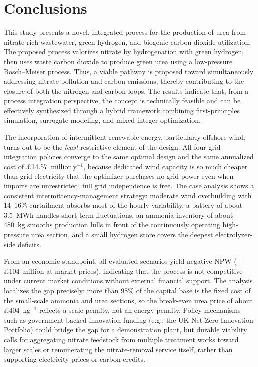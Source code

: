 \documentclass[letterpaper]{article}
\begin{document}
\section{Conclusions}

This study presents a novel, integrated process for the production of
urea from nitrate-rich wastewater, green hydrogen, and biogenic
carbon dioxide utilization. The proposed process valorizes nitrate by
hydrogenation with green hydrogen, then uses waste carbon dioxide to
produce green urea using a low-pressure Bosch--Meiser process. Thus,
a viable pathway is proposed toward simultaneously addressing nitrate
pollution and carbon emissions, thereby contributing to the closure
of both the nitrogen and carbon loops. The results indicate that,
from a process integration perspective, the concept is technically
feasible and can be effectively synthesized through a hybrid
framework combining first-principles simulation, surrogate modeling,
and mixed-integer optimization.

The incorporation of intermittent renewable energy, particularly
offshore wind, turns out to be the \emph{least} restrictive element
of the design. All four grid-integration policies converge to the
same optimal design and the same annualized cost of
\pounds 14.57~million\,y$^{-1}$, because dedicated wind capacity is
so much cheaper than grid electricity that the optimizer purchases no
grid power even when imports are unrestricted; full grid independence
is free. The case analysis shows a consistent
intermittency-management strategy: moderate wind overbuilding with
14--16\% curtailment absorbs most of the hourly variability, a
battery of about 3.5~MWh handles short-term fluctuations, an ammonia
inventory of about 480~kg smooths production lulls in front of the
continuously operating high-pressure urea section, and a small
hydrogen store covers the deepest electrolyzer-side deficits.

From an economic standpoint, all evaluated scenarios yield negative
NPW ($-$\pounds 104~million at market prices),
indicating that the process is not competitive under current market
conditions without external financial support. The analysis
localizes the gap precisely: more than 98\% of the capital base is
the fixed cost of the small-scale ammonia and urea sections, so the
break-even urea price of about \pounds 404~kg$^{-1}$ reflects a scale
penalty, not an energy penalty. Policy mechanisms such as
government-backed innovation funding (e.g., the UK Net Zero
Innovation Portfolio) could bridge the gap for a demonstration
plant, but durable viability calls for aggregating nitrate feedstock
from multiple treatment works toward larger scales or remunerating
the nitrate-removal service itself, rather than supporting
electricity prices or carbon credits.
\end{document}
